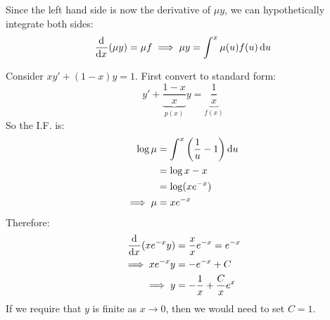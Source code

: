 \documentclass[../main.tex]{subfiles}
\begin{document}
Since the left hand side is now the derivative of $\mu y$, we can hypothetically integrate both sides:
\[
  \deriv{}{x}(\mu y) = \mu f \implies \mu y = \int^x \mu(u)f(u) \d{u}
\]
\begin{example}
  Consider $xy' + (1-x)y = 1$.
  First convert to standard form:
  \[
    y' + \underbrace{\frac{1-x}{x}}_{p(x)}y = \underbrace{\frac{1}{x}}_{f(x)}
  \]
  So the I.F. is:
  \begin{align*}
    \log \mu &= \int_{}^{x} \left(\frac{1}{u} - 1\right) \d{u} \\
            &= \log x - x \\
            &= \log(xe^{-x}) \\
    \implies \mu &= xe^{-x}
  \end{align*}
  Therefore:
  \begin{align*}
    \deriv{}{x}(xe^{-x}y) &= \frac{x}{x}e^{-x} = e^{-x}\\
    \implies xe^{-x}y &=-e^{-x} + C \\
    \implies y &= -\frac{1}{x} + \frac{C}{x}e^{x}
  \end{align*}
  If we require that $y$ is finite as $x \to 0$, then we would need to set $C = 1$.
\end{example}
\end{document}

